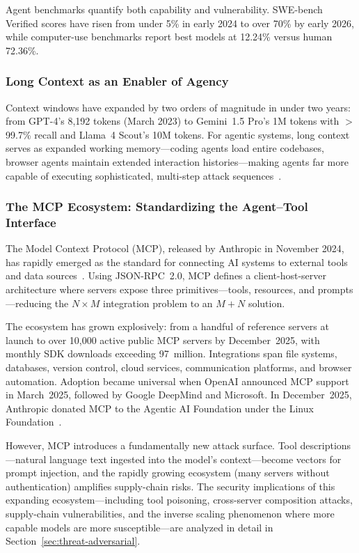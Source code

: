 Agent benchmarks quantify both capability and vulnerability. SWE-bench Verified scores have risen from under 5\% in early 2024 to over 70\% by early 2026, while computer-use benchmarks report best models at 12.24\% versus human 72.36\%.


\subsubsection{Long Context as an Enabler of Agency}
\label{sec:cap-context}

Context windows have expanded by two orders of magnitude in under two years: from GPT-4's 8,192 tokens (March 2023) to Gemini~1.5 Pro's 1M tokens with $>$99.7\% recall and Llama~4 Scout's 10M tokens. For agentic systems, long context serves as expanded working memory---coding agents load entire codebases, browser agents maintain extended interaction histories---making agents far more capable of executing sophisticated, multi-step attack sequences~\cite{anthropic2024effective}.


\subsubsection{The MCP Ecosystem: Standardizing the Agent--Tool Interface}
\label{sec:cap-mcp}

The Model Context Protocol (MCP), released by Anthropic in November 2024, has rapidly emerged as the standard for connecting AI systems to external tools and data sources~\cite{anthropic2024mcp}. Using JSON-RPC~2.0, MCP defines a client-host-server architecture where servers expose three primitives---tools, resources, and prompts---reducing the $N \times M$ integration problem to an $M+N$ solution.

The ecosystem has grown explosively: from a handful of reference servers at launch to over 10,000 active public MCP servers by December~2025, with monthly SDK downloads exceeding 97~million. Integrations span file systems, databases, version control, cloud services, communication platforms, and browser automation. Adoption became universal when OpenAI announced MCP support in March~2025, followed by Google DeepMind and Microsoft. In December~2025, Anthropic donated MCP to the Agentic AI Foundation under the Linux Foundation~\cite{anthropic2025aaif}.

However, MCP introduces a fundamentally new attack surface. Tool descriptions---natural language text ingested into the model's context---become vectors for prompt injection, and the rapidly growing ecosystem (many servers without authentication) amplifies supply-chain risks. The security implications of this expanding ecosystem---including tool poisoning, cross-server composition attacks, supply-chain vulnerabilities, and the inverse scaling phenomenon where more capable models are more susceptible---are analyzed in detail in Section~\ref{sec:threat-adversarial}.


